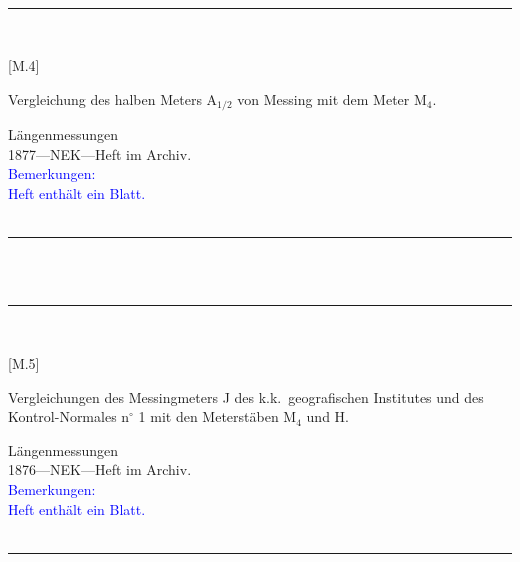 \vspace*{-2.5pt}\\
\parbox{\textwidth}{%
\rule{\textwidth}{1pt}\vspace*{-3mm}\\
\begin{minipage}[t]{0.2\textwidth}\vspace{0pt}
\Huge\rule[-4mm]{0cm}{1cm}[M.4]
\end{minipage}
\hfill
\begin{minipage}[t]{0.8\textwidth}\vspace{0pt}
\large Vergleichung des halben Meters {\glqq}A$_\mathrm{1/2}${\grqq} von Messing mit dem Meter {\glqq}M$_\mathrm{4}${\grqq}.\rule[-2mm]{0mm}{2mm}
\end{minipage}
{\footnotesize\flushright
Längenmessungen\\
}
1877\quad---\quad NEK\quad---\quad Heft im Archiv.\\
\textcolor{blue}{Bemerkungen:\\{}
Heft enthält ein Blatt.\\{}
}
\\[-15pt]
\rule{\textwidth}{1pt}
}
\\
\vspace*{-2.5pt}\\
\parbox{\textwidth}{%
\rule{\textwidth}{1pt}\vspace*{-3mm}\\
\begin{minipage}[t]{0.2\textwidth}\vspace{0pt}
\Huge\rule[-4mm]{0cm}{1cm}[M.5]
\end{minipage}
\hfill
\begin{minipage}[t]{0.8\textwidth}\vspace{0pt}
\large Vergleichungen des Messingmeters {\glqq}J{\grqq} des k.k.\ geografischen Institutes und des Kontrol-Normales n{$^\circ$} 1 mit den Meterstäben M$_\mathrm{4}$ und H.\rule[-2mm]{0mm}{2mm}
\end{minipage}
{\footnotesize\flushright
Längenmessungen\\
}
1876\quad---\quad NEK\quad---\quad Heft im Archiv.\\
\textcolor{blue}{Bemerkungen:\\{}
Heft enthält ein Blatt.\\{}
}
\\[-15pt]
\rule{\textwidth}{1pt}
}
\\
